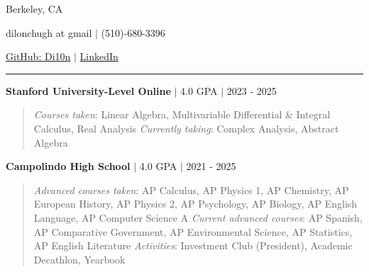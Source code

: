 \documentclass[12pt, letterpaper]{article}
\begin{document}
\vspace{5px}

\noindent Berkeley, CA
\vspace{5px}

\noindent dilonchugh at gmail $\vert$ (510)-680-3396
\vspace{5px}

\noindent \href{https://github.com/Di10n}{GitHub: Di10n} $\vert$ \href{https://www.linkedin.com/in/dilon-chugh/}{LinkedIn}

\vspace{5px}

\noindent\rule{3.75in}{0.5pt}

\quad

\vspace{-2.5px}
\vspace{-2.5px}

\quad

\noindent \textbf{Stanford University-Level Online} $\vert$ 4.0 GPA $\vert$ 2023 - 2025
\begin{quotation}
    \noindent \textit{Courses taken}: Linear Algebra, Multivariable Differential \& Integral Calculus, Real Analysis
    \vspace{5px}
    \newline \noindent \textit{Currently taking}: Complex Analysis, Abstract Algebra
\end{quotation}

\noindent \textbf{Campolindo High School} $\vert$ 4.0 GPA $\vert$ 2021 - 2025
\begin{quotation}
    \noindent \textit{Advanced courses taken}: AP Calculus, AP Physics 1, AP Chemistry, AP European History, AP Physics 2, AP Psychology, AP Biology, AP English Language, AP Computer Science A
    \vspace{5px}
    \newline \noindent \textit{Current advanced courses}: AP Spanish, AP Comparative Government, AP Environmental Science, AP Statistics, AP English Literature
    \vspace{5px}
    \newline \noindent \textit{Activities}: Investment Club (President), Academic Decathlon, Yearbook
\end{quotation}
\end{document}
